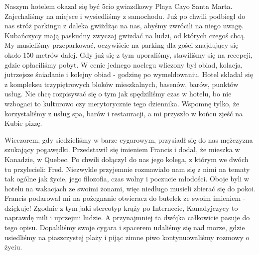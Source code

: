\noindent Naszym hotelem okazał się być 5cio gwiazdkowy Playa Cayo Santa Marta.
Zajechaliśmy na miejsce i wysiedliśmy z samochodu.
Już po chwili podbiegł do nas stróż parkingu z daleka gwiżdżąc na nas, abyśmy zwrócili na niego uwagę.
Kubańczycy mają paskudny zwyczaj gwizdać na ludzi, od których czegoś chcą.
My musieliśmy przeparkować, oczywiście na parking dla gości znajdujący się około 150 metrów dalej.
Gdy już się z tym uporaliśmy, stawiliśmy się na recepcji, gdzie opłaciliśmy pobyt.
W cenie jednego noclegu wliczony był obiad, kolacja, jutrzejsze śniadanie i kolejny obiad - godzinę po wymeldowaniu.
Hotel składał się z kompleksu trzypiętrowych bloków mieszkalnych, basenów, barów, punktów usług.
Nie chcę rozpisywać się o tym jak spędziliśmy czas w hotelu, bo nie wzbogaci to kulturowo czy merytorycznie tego dziennika.
Wspomnę tylko, że korzystaliśmy z usług spa, barów i restauracji, a mi przyszło w końcu zjeść na Kubie pizzę.
\par Wieczorem, gdy siedzieliśmy w barze cygarowym, przysiadł się do nas mężczyzna szukający pogawędki.
Przedstawił się imieniem Francis i dodał, że mieszka w Kanadzie, w Quebec.
Po chwili dołączył do nas jego kolega, z którym we dwóch tu przylecieli: Fred.
Niezwykle przyjemnie rozmawiało nam się z nimi na tematy tak ogólne jak życie, jego filozofia, czas wolny i poczucie młodości.
Oboje byli w hotelu na wakacjach ze swoimi żonami, więc niedługo musieli zbierać się do pokoi.
Francis podarował mi na pożegnanie otwieracz do butelek ze swoim imieniem - dziękuje!
Zgodnie z tym jaki stereotyp krąży po Internecie, Kanadyjczycy to naprawdę mili i uprzejmi ludzie.
A przynajmniej ta dwójka całkowicie pasuje do tego opisu.
Dopaliliśmy swoje cygara i spacerem udaliśmy się nad morze, gdzie usiedliśmy na piaszczystej plaży i pijąc zimne piwo kontynuowaliśmy rozmowy o życiu.